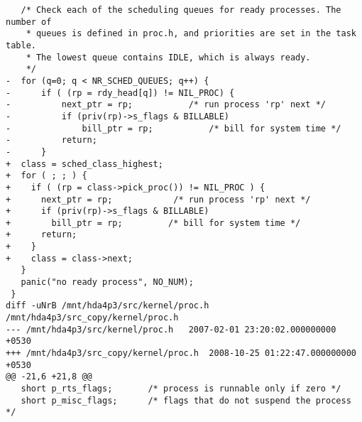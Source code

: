 \begin{verbatim}
   /* Check each of the scheduling queues for ready processes. The number of
    * queues is defined in proc.h, and priorities are set in the task table.
    * The lowest queue contains IDLE, which is always ready.
    */
-  for (q=0; q < NR_SCHED_QUEUES; q++) {	
-      if ( (rp = rdy_head[q]) != NIL_PROC) {
-          next_ptr = rp;			/* run process 'rp' next */
-          if (priv(rp)->s_flags & BILLABLE)	 	
-              bill_ptr = rp;			/* bill for system time */
-          return;				 
-      }
+  class = sched_class_highest; 
+  for ( ; ; ) { 
+    if ( (rp = class->pick_proc()) != NIL_PROC ) {
+      next_ptr = rp;			 /* run process 'rp' next */
+      if (priv(rp)->s_flags & BILLABLE)	 	
+        bill_ptr = rp;			/* bill for system time */
+      return;				 
+    }
+    class = class->next; 
   }
   panic("no ready process", NO_NUM);
 }
diff -uNrB /mnt/hda4p3/src/kernel/proc.h /mnt/hda4p3/src_copy/kernel/proc.h
--- /mnt/hda4p3/src/kernel/proc.h	2007-02-01 23:20:02.000000000 +0530
+++ /mnt/hda4p3/src_copy/kernel/proc.h	2008-10-25 01:22:47.000000000 +0530
@@ -21,6 +21,8 @@
   short p_rts_flags;		/* process is runnable only if zero */
   short p_misc_flags;		/* flags that do not suspend the process */
 

\end{verbatim}
